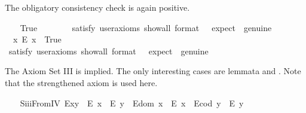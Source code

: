 \begin{isabellebody}
\begin{isamarkuptext}%
The obligatory consistency check is again positive.%
\end{isamarkuptext}\isamarkuptrue%
\ \ \isamarkupfalse%
\ True\ \ %
\isanewline
\ \ \ \ \isamarkupfalse%
\ {\isacharbrackleft}satisfy{\isacharcomma}\ user{\isacharunderscore}axioms{\isacharcomma}\ show{\isacharunderscore}all{\isacharcomma}\ format\ {\isacharequal}\ {}{\isacharcomma}\ expect\ {\isacharequal}\ genuine{\isacharbrackright}%
\isadelimproof
\ %
\endisadelimproof
%
\isatagproof
{}\isamarkupfalse%
%
\endisatagproof
{\isafoldproof}%
%
\isadelimproof
%
\endisadelimproof
\isanewline
\ \ \isamarkupfalse%
\ \ {\isachardoublequoteopen}{\isasymexists}x{\isachardot}\ \isactrlbold {\isasymnot}{\isacharparenleft}E\ x{\isacharparenright}{\isachardoublequoteclose}\ \ True\ \ %
\ \ \isanewline
\ \ \ \ \isamarkupfalse%
\ {\isacharbrackleft}satisfy{\isacharcomma}\ user{\isacharunderscore}axioms{\isacharcomma}\ show{\isacharunderscore}all{\isacharcomma}\ format\ {\isacharequal}\ {}{\isacharcomma}\ expect\ {\isacharequal}\ genuine{\isacharbrackright}%
\isadelimproof
\ %
\endisadelimproof
%
\isatagproof
{}\isamarkupfalse%
%
\endisatagproof
{\isafoldproof}%
%
\isadelimproof
%
\endisadelimproof
%
\begin{isamarkuptext}%
The Axiom Set III is implied. The only interesting cases are 
 lemmata  and . Note that the strengthened 
 axiom  is used here.%
\end{isamarkuptext}\isamarkuptrue%
\ \ \isamarkupfalse%
\ S\isactrlsub i\isactrlsub i\isactrlsub iFromIV{\isacharcolon}\ {\isachardoublequoteopen}{\isacharparenleft}E{\isacharparenleft}x{\isasymcdot}y{\isacharparenright}\ \isactrlbold {\isasymrightarrow}\ {\isacharparenleft}E\ x\ \isactrlbold {\isasymand}\ E\ y{\isacharparenright}{\isacharparenright}\ \isactrlbold {\isasymand}\ {\isacharparenleft}E{\isacharparenleft}dom\ x{\isacharparenright}\ \isactrlbold {\isasymrightarrow}\ E\ x{\isacharparenright}\ \isactrlbold {\isasymand}\ {\isacharparenleft}E{\isacharparenleft}cod\ y{\isacharparenright}\ \isactrlbold {\isasymrightarrow}\ E\ y{\isacharparenright}{\isachardoublequoteclose}\ \ \isanewline
%
\isadelimproof

\end{isabellebody}
